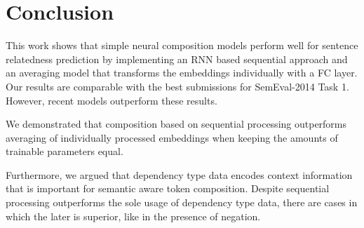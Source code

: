 










\section{Conclusion}

This work shows that simple neural composition models perform well for sentence relatedness prediction by implementing an \ac{RNN} based sequential approach and an averaging model that transforms the embeddings individually with a \ac{FC} layer. Our results are comparable with the best submissions for SemEval-2014 Task 1. However, recent models outperform these results.

We demonstrated that composition based on sequential processing outperforms averaging of individually processed embeddings when keeping the amounts of trainable parameters equal. 

Furthermore, we argued that dependency type data encodes context information that is important for semantic aware token composition. Despite sequential processing outperforms the sole usage of dependency type data, there are cases in which the later is superior, like in the presence of negation. %


